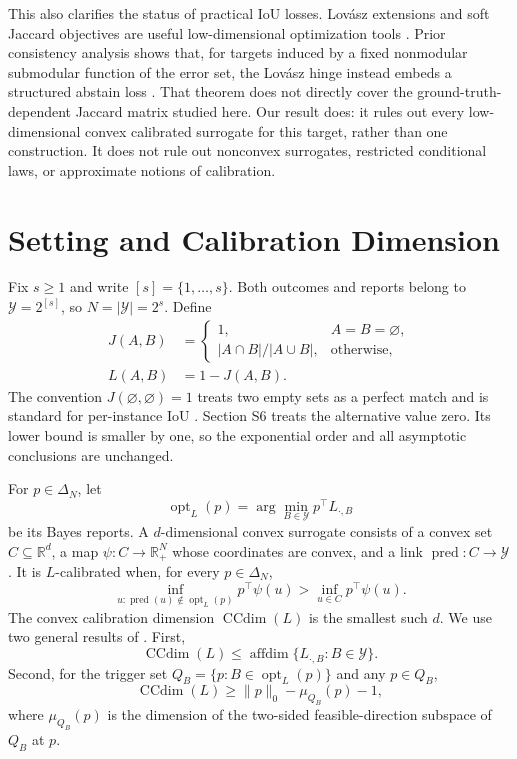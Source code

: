 \documentclass[twoside]{article}
\newcommand{\Y}{\mathcal Y}
\newcommand{\simplex}{\Delta}
\newcommand{\CCdim}{\operatorname{CCdim}}
\newcommand{\affdim}{\operatorname{affdim}}
\newcommand{\1}{\mathbf 1}
\begin{document}
This also clarifies the status of practical IoU losses. Lov\'asz extensions and soft Jaccard objectives are useful low-dimensional optimization tools \citep{berman2018lovasz,wang2023jaccard}. Prior consistency analysis shows that, for targets induced by a fixed nonmodular submodular function of the error set, the Lov\'asz hinge instead embeds a structured abstain loss \citep{finocchiaro2022structured}. That theorem does not directly cover the ground-truth-dependent Jaccard matrix studied here. Our result does: it rules out every low-dimensional convex calibrated surrogate for this target, rather than one construction. It does not rule out nonconvex surrogates, restricted conditional laws, or approximate notions of calibration.

\section{Setting and Calibration Dimension}

Fix $s\geq1$ and write $[s]=\{1,\ldots,s\}$. Both outcomes and reports belong to $\Y=2^{[s]}$, so $N=|\Y|=2^s$. Define
\begin{align}
J(A,B)&=
\begin{cases}
1,&A=B=\varnothing,\\
|A\cap B|/|A\cup B|,&\text{otherwise},
\end{cases}\\
L(A,B)&=1-J(A,B).
\label{eq:jaccard}
\end{align}
The convention $J(\varnothing,\varnothing)=1$ treats two empty sets as a perfect match and is standard for per-instance IoU \citep{berman2018lovasz}. Section S6 treats the alternative value zero. Its lower bound is smaller by one, so the exponential order and all asymptotic conclusions are unchanged.

For $p\in\simplex_N$, let
\begin{equation}
\operatorname{opt}_L(p)=\arg\min_{B\in\Y}p^\top L_{\cdot,B}
\end{equation}
be its Bayes reports. A $d$-dimensional convex surrogate consists of a convex set $C\subseteq\mathbb R^d$, a map $\psi:C\to\mathbb R_+^N$ whose coordinates are convex, and a link $\operatorname{pred}:C\to\Y$. It is $L$-calibrated when, for every $p\in\simplex_N$,
\begin{equation}
\inf_{u:\operatorname{pred}(u)\notin\operatorname{opt}_L(p)}p^\top\psi(u)
>
\inf_{u\in C}p^\top\psi(u).
\label{eq:calibration}
\end{equation}
The convex calibration dimension $\CCdim(L)$ is the smallest such $d$. We use two general results of \citet{ramaswamy2016convex}. First,
\begin{equation}
\CCdim(L)\leq\affdim\{L_{\cdot,B}:B\in\Y\}.
\label{eq:affine-upper}
\end{equation}
Second, for the trigger set $Q_B=\{p:B\in\operatorname{opt}_L(p)\}$ and any $p\in Q_B$,
\begin{equation}
\CCdim(L)\geq\|p\|_0-\mu_{Q_B}(p)-1,
\label{eq:feasible-lower}
\end{equation}
where $\mu_{Q_B}(p)$ is the dimension of the two-sided feasible-direction subspace of $Q_B$ at $p$.
\end{document}
